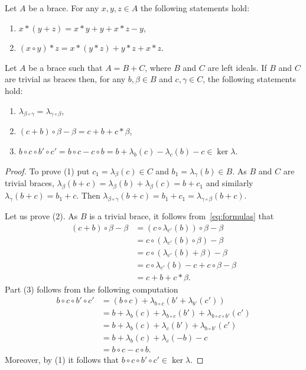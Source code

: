 \begin{lemma} 
\label{lem:calcbraces}
Let $A$ be a brace. For any $x,y,z \in A$ the following statements hold:
\begin{enumerate}
    \item $x*(y+z) = x*y +y +x*z -y$,
    \item $(x\circ y)*z = x*(y*z) + y*z + x*z$.
\end{enumerate}
\end{lemma}

\begin{lemma}\label{lem:calculations}
    Let $A$ be a brace such that $A = B+C$, where $B$ and $C$ are left ideals. If $B$ and $C$ are trivial as braces then,
    for any $b,\beta \in B$ and $c,\gamma \in C$, the following statements hold:
	\begin{enumerate}
	    \item $\lambda_{\beta \circ \gamma} = \lambda_{\gamma \circ \beta}$,
	    \item $(c + b) \circ \beta - \beta = c + b + c* \beta $,
	    \item $b\circ c \circ b' \circ c' = b \circ c - c\circ b = b + \lambda_b(c) - \lambda_c(b) -c \in \ker \lambda$.
	\end{enumerate}
\end{lemma}

\begin{proof}
	To prove (1) put $c_1=\lambda_\beta(c)\in C$ and $b_1=\lambda_{\gamma}(b)\in B$. As $B$ and $C$ are trivial braces, $\lambda_\beta(b+c) =\lambda_{\beta}(b)+\lambda_\beta(c)=b+c_1$ and similarly 
	$\lambda_\gamma(b+c)=b_1+c$.
	Then $\lambda_{\beta\circ\gamma}(b+c)=b_1+c_1=\lambda_{\gamma\circ\beta}(b+c)$. 
	
	Let us prove (2). As $B$ is a trivial brace, it follows from~\eqref{eq:formulas} that 
	\begin{align*}
		(c+b)\circ\beta-\beta &= (c\circ\lambda_{c'}(b))\circ\beta-\beta\\
		&=c\circ(\lambda_{c'}(b)\circ\beta)-\beta\\
		&=c\circ(\lambda_{c'}(b)+\beta)-\beta\\
		&=c\circ\lambda_{c'}(b)-c+c\circ\beta-\beta\\
		&=c+b+c*\beta.
	\end{align*}
	Part (3) follows from the following computation
	\begin{align*}
	    b \circ c \circ b' \circ c' &= (b\circ c) +\lambda_{b\circ c} (b' + \lambda_{b'}(c'))\\
	    &=b + \lambda_b(c) + \lambda_{b\circ c}(b') + \lambda_{b \circ c \circ b'}(c')\\
	     &= b+\lambda_{b}(c) + \lambda_{c}(b') + \lambda_{b\circ b'}(c')\\ 
	                                & =b + \lambda_b(c) +\lambda_c(-b) -c\\
	                                & =b \circ c - c \circ b.
	\end{align*}
	Moreover, by (1) it follows that $b \circ c \circ b' \circ c' \in \ker \lambda$.
\end{proof}

